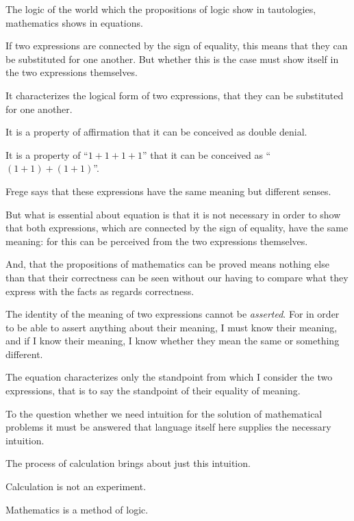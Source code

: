 {The logic of the world which the propositions
of logic show in tautologies, mathematics shows
in equations.}


{{\stretchyspace
If two expressions are connected by the sign of
equality, this means that they can be substituted
for one another. But whether this is the case
must show itself in the two expressions themselves.}

It characterizes the logical form of two expressions,
that they can be substituted for one
another.}


{It is a property of affirmation that it can be
conceived as double denial.

It is a property of ``$1 + 1 + 1 + 1$'' that it can be
conceived as ``$(1 + 1) + (1 + 1)$''.}


{Frege says that these expressions have the same
meaning but different senses.

But what is essential about equation is that it
is not necessary in order to show that both expressions,
which are connected by the sign of
equality, have the same meaning: for this can be
perceived from the two expressions themselves.}


{And, that the propositions of mathematics can
be proved means nothing else than that their
correctness can be seen without our having to
compare what they express with the facts as regards
correctness.}


{The identity of the meaning of two expressions
cannot be \emph{asserted}. For in order to be able to
assert anything about their meaning, I must know
their meaning, and if I know their meaning, I
know whether they mean the same or something
different.}


{The equation characterizes only the standpoint
from which I consider the two expressions, that
is to say the standpoint of their equality of
meaning.}


{To the question whether we need intuition for
the solution of mathematical problems it must be
answered that language itself here supplies the
necessary intuition.}


{The process of calculation brings about just
this intuition.

Calculation is not an experiment.}


{Mathematics is a method of logic.}


